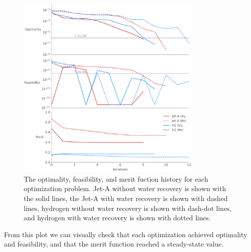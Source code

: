 \documentclass[conf]{new-aiaa}
\begin{document}
\begin{figure}[hbt!]
    \centering
    \includegraphics[width=0.8\textwidth]{opt_summary.pdf}
    \caption{The optimality, feasibility, and merit fuction history for each optimization problem.
        Jet-A without water recovery is shown with the solid lines, the Jet-A with water recovery is shown with dashed lines, hydrogen without water recovery is shown with dash-dot lines, and hydrogen with water recovery is shown with dotted lines.}
    \label{fig:history_summary}
\end{figure}

From this plot we can visually check that each optimization achieved optimality and feasibility, and that the merit function reached a steady-state value.
\end{document}
